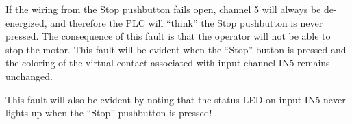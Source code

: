 \vskip 10pt

If the wiring from the Stop pushbutton fails open, channel 5 will always be de-energized, and therefore the PLC will ``think'' the Stop pushbutton is never pressed.  The consequence of this fault is that the operator will not be able to stop the motor.  This fault will be evident when the ``Stop'' button is pressed and the coloring of the virtual contact associated with input channel IN5 remains unchanged.

This fault will also be evident by noting that the status LED on input IN5 never lights up when the ``Stop'' pushbutton is pressed!




